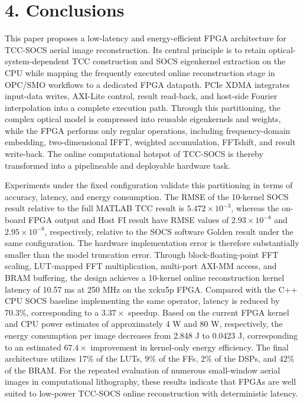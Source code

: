 \documentclass[
  preprint]{elsarticle}
\begin{document}
\section{4. Conclusions}\label{conclusions}

This paper proposes a low-latency and energy-efficient FPGA architecture
for TCC-SOCS aerial image reconstruction. Its central principle is to
retain optical-system-dependent TCC construction and SOCS eigenkernel
extraction on the CPU while mapping the frequently executed online
reconstruction stage in OPC/SMO workflows to a dedicated FPGA datapath.
PCIe XDMA integrates input-data writes, AXI-Lite control, result
read-back, and host-side Fourier interpolation into a complete execution
path. Through this partitioning, the complex optical model is compressed
into reusable eigenkernels and weights, while the FPGA performs only
regular operations, including frequency-domain embedding,
two-dimensional IFFT, weighted accumulation, FFTshift, and result
write-back. The online computational hotspot of TCC-SOCS is thereby
transformed into a pipelineable and deployable hardware task.

Experiments under the fixed configuration validate this partitioning in
terms of accuracy, latency, and energy consumption. The RMSE of the
10-kernel SOCS result relative to the full MATLAB TCC result is
\(5.472\times10^{-3}\), whereas the on-board FPGA output and Host FI
result have RMSE values of \(2.93\times10^{-8}\) and
\(2.95\times10^{-8}\), respectively, relative to the SOCS software
Golden result under the same configuration. The hardware implementation
error is therefore substantially smaller than the model truncation
error. Through block-floating-point FFT scaling, LUT-mapped FFT
multiplication, multi-port AXI-MM access, and BRAM buffering, the design
achieves a 10-kernel online reconstruction kernel latency of 10.57 ms at
250 MHz on the xcku5p FPGA. Compared with the C++ CPU SOCS baseline
implementing the same operator, latency is reduced by 70.3\%,
corresponding to a \(3.37\times\) speedup. Based on the current FPGA
kernel and CPU power estimates of approximately 4 W and 80 W,
respectively, the energy consumption per image decreases from 2.848 J to
0.0423 J, corresponding to an estimated \(67.4\times\) improvement in
kernel-only energy efficiency. The final architecture utilizes 17\% of
the LUTs, 9\% of the FFs, 2\% of the DSPs, and 42\% of the BRAM. For the
repeated evaluation of numerous small-window aerial images in
computational lithography, these results indicate that FPGAs are well
suited to low-power TCC-SOCS online reconstruction with deterministic
latency.
\end{document}
